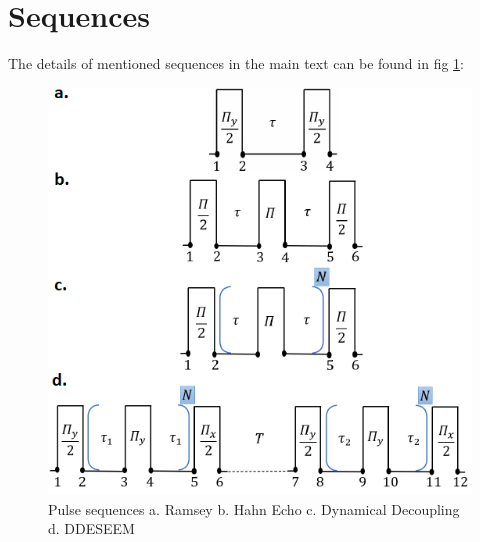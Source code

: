 \documentclass[%
 reprint,
superscriptaddress,
 amsmath,amssymb,
 aps,
]{revtex4-2}
\begin{document}
\section{Sequences}
\label{app:seqs}
The details of mentioned sequences in the main text can be found in fig \ref{fig:seqs}:
\begin{figure}%
	\begin{center}
		\includegraphics[width=0.9\columnwidth]{figure_5.png}
		\caption{Pulse sequences a. Ramsey b. Hahn Echo c. Dynamical Decoupling d. DDESEEM}
		\label{fig:seqs}
	\end{center}
\end{figure}
\end{document}

